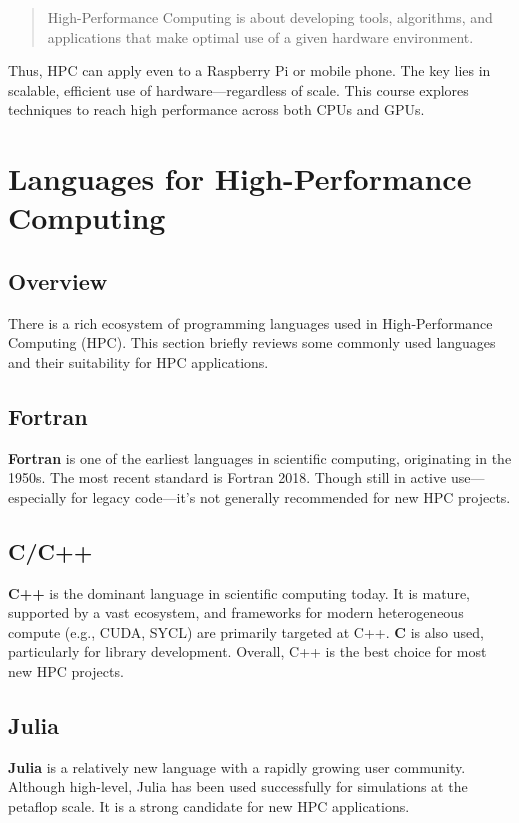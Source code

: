 \documentclass{book}
\begin{document}
\begin{quotation}
High-Performance Computing is about developing tools, algorithms, and applications that make optimal use of a given hardware environment.
\end{quotation}

Thus, HPC can apply even to a Raspberry Pi or mobile phone. The key lies in scalable, efficient use of hardware—regardless of scale. This course explores techniques to reach high performance across both CPUs and GPUs.

\chapter{Languages for High-Performance Computing}

\section*{Overview}
There is a rich ecosystem of programming languages used in High-Performance Computing (HPC). This section briefly reviews some commonly used languages and their suitability for HPC applications.

\section{Fortran}
\textbf{Fortran} is one of the earliest languages in scientific computing, originating in the 1950s. The most recent standard is Fortran 2018. Though still in active use—especially for legacy code—it's not generally recommended for new HPC projects.

\section{C/C++}
\textbf{C++} is the dominant language in scientific computing today. It is mature, supported by a vast ecosystem, and frameworks for modern heterogeneous compute (e.g., CUDA, SYCL) are primarily targeted at C++. \textbf{C} is also used, particularly for library development. Overall, C++ is the best choice for most new HPC projects.

\section{Julia}
\textbf{Julia} is a relatively new language with a rapidly growing user community. Although high-level, Julia has been used successfully for simulations at the petaflop scale. It is a strong candidate for new HPC applications.
\end{document}
